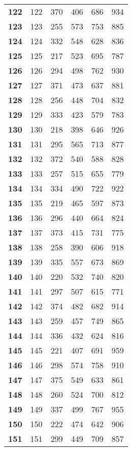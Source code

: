 \begin{longtable}{|l|c|c|c|c|c|}
  \textbf{122} & 122 &370 & 406 & 686 & 934 \\
  \textbf{123} & 123 &255 & 573 & 753 & 885 \\
  \textbf{124} & 124 &332 & 548 & 628 & 836 \\
  \textbf{125} & 125 &217 & 523 & 695 & 787 \\
  \textbf{126} & 126 &294 & 498 & 762 & 930 \\
  \textbf{127} & 127 &371 & 473 & 637 & 881 \\
  \textbf{128} & 128 &256 & 448 & 704 & 832 \\
  \textbf{129} & 129 &333 & 423 & 579 & 783 \\
  \textbf{130} & 130 &218 & 398 & 646 & 926 \\
  \textbf{131} & 131 &295 & 565 & 713 & 877 \\
  \textbf{132} & 132 &372 & 540 & 588 & 828 \\
  \textbf{133} & 133 &257 & 515 & 655 & 779 \\
  \textbf{134} & 134 &334 & 490 & 722 & 922 \\
  \textbf{135} & 135 &219 & 465 & 597 & 873 \\
  \textbf{136} & 136 &296 & 440 & 664 & 824 \\
  \textbf{137} & 137 &373 & 415 & 731 & 775 \\
  \textbf{138} & 138 &258 & 390 & 606 & 918 \\
  \textbf{139} & 139 &335 & 557 & 673 & 869 \\
  \textbf{140} & 140 &220 & 532 & 740 & 820 \\
  \textbf{141} & 141 &297 & 507 & 615 & 771 \\
  \textbf{142} & 142 &374 & 482 & 682 & 914 \\
  \textbf{143} & 143 &259 & 457 & 749 & 865 \\
  \textbf{144} & 144 &336 & 432 & 624 & 816 \\
  \textbf{145} & 145 &221 & 407 & 691 & 959 \\
  \textbf{146} & 146 &298 & 574 & 758 & 910 \\
  \textbf{147} & 147 &375 & 549 & 633 & 861 \\
  \textbf{148} & 148 &260 & 524 & 700 & 812 \\
  \textbf{149} & 149 &337 & 499 & 767 & 955 \\
  \textbf{150} & 150 &222 & 474 & 642 & 906 \\
  \textbf{151} & 151 &299 & 449 & 709 & 857 \\

\end{longtable}
